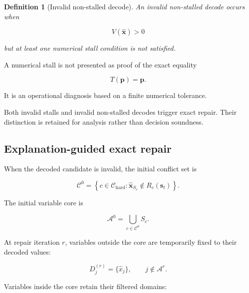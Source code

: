 \documentclass[pdflatex,sn-mathphys-num,iicol,oneside]{sn-jnl}
\newtheorem{definition}{Definition}
\begin{document}
\begin{definition}[Invalid non-stalled decode]
An invalid non-stalled decode occurs when

\begin{equation}
V(\widehat{\bm{x}})>0
\end{equation}

but at least one numerical stall condition is not satisfied.
\end{definition}

A numerical stall is not presented as proof of the exact equality

\begin{equation}
T(\bm{p})=\bm{p}.
\end{equation}

It is an operational diagnosis based on a finite numerical tolerance.

Both invalid stalls and invalid non-stalled decodes trigger exact
repair. Their distinction is retained for analysis rather than
decision soundness.

\subsection{Explanation-guided exact repair}
\label{sec:repair}

When the decoded candidate is invalid, the initial conflict set is

\begin{equation}
\mathcal{C}^{0}
=
\left\{
c\in\mathcal{C}_{\mathrm{hard}}:
\widehat{\bm{x}}_{S_c}
\notin R_c(\bm{s}_t)
\right\}.
\label{eq:initial-conflicts}
\end{equation}

The initial variable core is

\begin{equation}
\mathcal{A}^{0}
=
\bigcup_{c\in\mathcal{C}^{0}}S_c.
\label{eq:initial-core}
\end{equation}

At repair iteration $r$, variables outside the core are temporarily
fixed to their decoded values:

\begin{equation}
D_j^{(r)}
=
\{\widehat{x}_j\},
\qquad
j\notin\mathcal{A}^{r}.
\label{eq:boundary-fixing}
\end{equation}

Variables inside the core retain their filtered domains:
\end{document}
